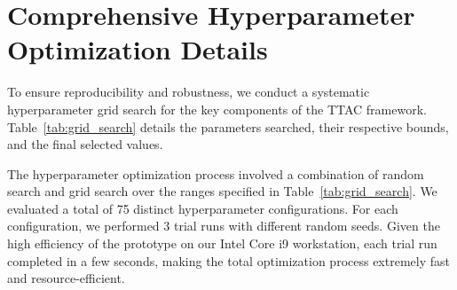 \documentclass[manuscript, screen, review]{jair}
\begin{document}
\section{Comprehensive Hyperparameter Optimization Details}\label{app:sec_hyperparams}
To ensure reproducibility and robustness, we conduct a systematic hyperparameter grid search for the key components of the TTAC framework. Table~\ref{tab:grid_search} details the parameters searched, their respective bounds, and the final selected values.

\begin{table}[htbp]
\centering
\caption{Hyperparameter Search Space and Optimal Configuration}
\label{tab:grid_search}
\vskip 0.1in
\begin{small}
\end{small}
\end{table}

The hyperparameter optimization process involved a combination of random search and grid search over the ranges specified in Table~\ref{tab:grid_search}. We evaluated a total of 75 distinct hyperparameter configurations. For each configuration, we performed 3 trial runs with different random seeds. Given the high efficiency of the prototype on our Intel Core i9 workstation, each trial run completed in a few seconds, making the total optimization process extremely fast and resource-efficient.
\end{document}
